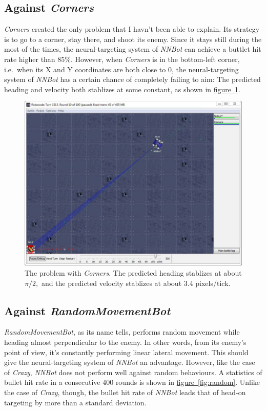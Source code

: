 \documentclass[11pt,a4paper]{article}
\begin{document}
\subsection{Against \emph{Corners}}

\emph{Corners} created the only problem that I havn't been able to explain. Its strategy is to go to a corner, stay there, and shoot its enemy. Since it stays still during the most of the times, the neural-targeting system of \emph{NNBot} can achieve a buttlet hit rate higher than $85\%.$ However, when \emph{Corners} is in the bottom-left corner, i.e.\ when its X and Y coordinates are both close to 0, the neural-targeting system of \emph{NNBot} has a certain chance of completely failing to aim: The predicted heading and velocity both stablizes at some constant, as shown in \hyperref[fig:corners]{figure~\ref{fig:corners}}.

\begin{figure}[h]
	\centering
	\includegraphics[scale=0.65]{corners.pdf}
	\caption{The problem with \emph{Corners}. The predicted heading stablizes at about $\pi/2,$ and the predicted velocity stablizes at about 3.4 pixels/tick.}
	\label{fig:corners}
\end{figure}

\clearpage

\subsection{Against \emph{RandomMovementBot}}

\emph{RandomMovementBot}, as its name tells, performs random movement while heading almost perpendicular to the enemy. In other words, from its enemy's point of view, it's constantly performing linear lateral movement. This should give the neural-targeting system of \emph{NNBot} an advantage. However, like the case of \emph{Crazy}, \emph{NNBot} does not perform well against random behaviours. A statistics of bullet hit rate in a consecutive 400 rounds is shown in \hyperref[fig:random]{figure~\ref{fig:random}}. Unlike the case of \emph{Crazy}, though, the bullet hit rate of \emph{NNBot} leads that of head-on targeting by more than a standard deviation.
\end{document}
